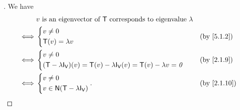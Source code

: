 \begin{proof}[]
  We have
  \begin{align*}
         & v \text{ is an eigenvector of } \T \text{ corresponds to eigenvalue } \lambda                             \\
    \iff & \begin{dcases}
             v \neq 0 \\
             \T(v) = \lambda v
           \end{dcases}                                                                &  & \text{(by \cref{5.1.2})} \\
    \iff & \begin{dcases}
             v \neq 0 \\
             (\T - \lambda \IT[\V])(v) = \T(v) - \lambda \IT[\V](v) = \T(v) - \lambda v = \zv
           \end{dcases} &  & \text{(by \cref{2.1.9})}                           \\
    \iff & \begin{dcases}
             v \neq 0 \\
             v \in \ns{\T - \lambda \IT[\V]}
           \end{dcases}.                                   &  & \text{(by \cref{2.1.10})}
  \end{align*}
\end{proof}

